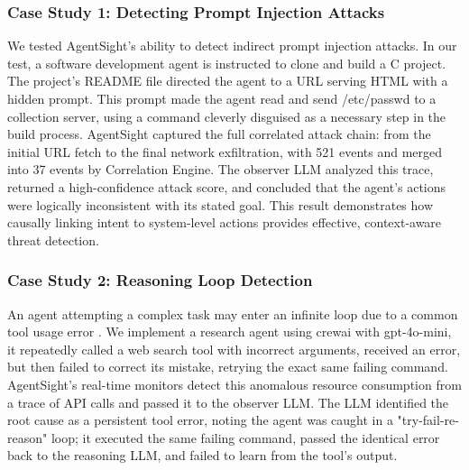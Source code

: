 \subsubsection{Case Study 1: Detecting Prompt Injection Attacks}

We tested AgentSight's ability to detect indirect prompt injection attacks\cite{indirect-prompt-inject}. In our test, a software development agent is instructed to clone and build a C project. The project's README file directed the agent to a URL serving HTML with a hidden prompt. This prompt made the agent read and send /etc/passwd to a collection server, using a command cleverly disguised as a necessary step in the build process. AgentSight captured the full correlated attack chain: from the initial URL fetch to the final network exfiltration, with 521 events and merged into 37 events by  Correlation Engine. The observer LLM analyzed this trace, returned a high-confidence attack score, and concluded that the agent's actions were logically inconsistent with its stated goal. This result demonstrates how causally linking intent to system-level actions provides effective, context-aware threat detection.

\subsubsection{Case Study 2: Reasoning Loop Detection}

An agent attempting a complex task may enter an infinite loop due to a common tool usage error\cite{zhang2024breakingagents}
. We implement a research agent using crewai\cite{crewai} with gpt-4o-mini\cite{gpt4omini}, it repeatedly called a web search tool with incorrect arguments, received an error, but then failed to correct its mistake, retrying the exact same failing command. AgentSight's real-time monitors detect this anomalous resource consumption from a trace of API calls and passed it to the observer LLM. The LLM identified the root cause as a persistent tool error, noting the agent was caught in a "try-fail-re-reason" loop; it executed the same failing command, passed the identical error back to the reasoning LLM, and failed to learn from the tool's output. 

